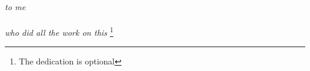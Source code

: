 \thispagestyle{plain}
\mbox{}
\vspace{2in}
\begin{center}
{\em to me \\ \ \\
who did all the work on this}
\footnote{The dedication is optional}
\end{center}
